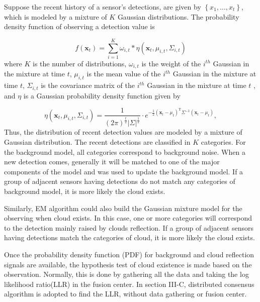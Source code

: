Suppose the recent history of a sensor's detections, are given by
$\left\{ x_{1},\ldots,x_{t}\right\} $, which is modeled by a mixture
of $K$ Gaussian distributions. The probability density function of
observing a detection value is

\begin{equation}
f(\mathbf{x}_{t})=\sum_{i=1}^{K}\omega_{i,t}*\eta(\mathbf{x}_{t},\mu_{i,t},\Sigma_{i,t})\label{eq:GMM density function}
\end{equation}
where $K$ is the number of distributions, $\omega_{i,t}$ is the
weight of the $i^{th}$ Gaussian in the mixture at time $t$, $\mu_{i,t}$
is the mean value of the $i^{th}$ Gaussian in the mixture at time
$t$, $\Sigma_{i,t}$ is the covariance matrix of the $i^{th}$ Gaussian
in the mixture at time $t$ , and $\eta$ is a Gaussian probability
density function given by

\begin{equation}
\eta(\mathbf{x}_{t},\mu_{i,t},\Sigma_{i,t})=\frac{1}{\left(2\pi\right)^{\frac{t}{2}}\left|\Sigma\right|^{\frac{1}{2}}}\cdot e^{-\frac{1}{2}\left(\mathbf{x}_{t}-\mu_{t}\right)^{\mathrm{T}}\Sigma^{-1}\left(\mathbf{x}_{t}-\mu_{t}\right)},
\end{equation}
Thus, the distribution of recent detection values are modeled by a
mixture of Gaussian distribution. The recent detections are classified
in $K$ categories. For the background model, all categories correspond
to background noise. When a new detection comes, generally it will
be matched to one of the major components of the model and was used
to update the background model. If a group of adjacent sensors having
detections do not match any categories of background model, it is
more likely the cloud exists. 

Similarly, EM algorithm could also build the Gaussian mixture model
for the observing when cloud exists. In this case, one or more categories
will correspond to the detection mainly raised by clouds reflection.
If a group of adjacent sensors having detections match the categories
of cloud, it is more likely the cloud exists. 

Once the probability density function (PDF) for background and cloud
reflection signals are available, the hypothesis test of cloud existence
is made based on the observation. Normally, this is done by gathering
all the data and taking the log likelihood ratio(LLR) in the fusion
center. In section III-C, distributed consensus algorithm is adopted
to find the LLR, without data gathering or fusion center.


